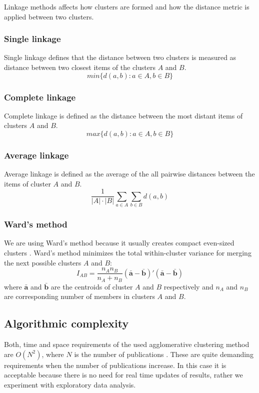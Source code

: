 
Linkage methods affects how clusters are formed and how the 
distance metric is applied between two clusters.

\subsubsection{Single linkage}
Single linkage defines that the distance between two clusters is 
measured as distance between two closest items of the clusters 
$A$ and $B$.
\begin{equation}
 min\{d(a,b):a \in A, b \in B\}
\end{equation}

\subsubsection{Complete linkage}
Complete linkage is defined as the distance between the most 
distant items of clusters $A$ and $B$.
\begin{equation}
 max\{d(a,b):a \in A, b \in B\}
\end{equation}

\subsubsection{Average linkage}
Average linkage is defined as the average of the all pairwise 
distances between the items of cluster $A$ and $B$.
\begin{equation}
 \frac{1}{|A| \cdot |B|} \sum_{a \in A} \sum_{b \in B}d(a,b)
\end{equation}

\subsubsection{Ward's method}
We are using Ward's method because it usually creates compact 
even-sized clusters \cite{strauss_generalising_2017}. Ward's 
method minimizes the total within-cluster variance for merging 
the next possible clusters $A$ and $B$:
\begin{equation}
 I_{AB} = \frac{n_A n_B}{n_A + n_B} (\bar{\textbf{a}} - \bar{\textbf{b}})'(\bar{\textbf{a}}-\bar{\textbf{b}})
\end{equation}
where $\bar{\textbf{a}}$ and $\bar{\textbf{b}}$ are the centroids
of cluster $A$ and $B$ respectively and $n_A$ and $n_B$ are
corresponding number of members in clusters $A$ and $B$.


\subsection{Algorithmic complexity}
Both, time and space requirements of the used agglomerative clustering 
method are $O(N^2)$, where $N$ is the number of publications 
\cite{willett_recent_1988}. These are quite demanding requirements
when the number of publications increase. In this case it is 
acceptable because there is no need for real time updates of 
results, rather we experiment with exploratory data analysis.



